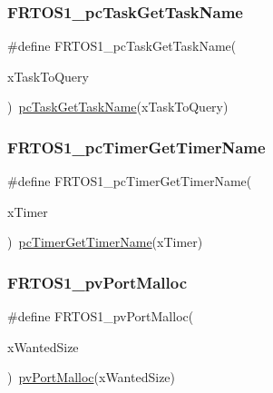 \subsubsection{\texorpdfstring{F\+R\+T\+O\+S1\+\_\+pc\+Task\+Get\+Task\+Name}{FRTOS1\_pcTaskGetTaskName}}
{\footnotesize\ttfamily \#define F\+R\+T\+O\+S1\+\_\+pc\+Task\+Get\+Task\+Name(\begin{DoxyParamCaption}\item[{}]{x\+Task\+To\+Query }\end{DoxyParamCaption})~\hyperlink{_free_r_t_o_s_8h_a626c65afa49005d067495a6cdaace885}{pc\+Task\+Get\+Task\+Name}(x\+Task\+To\+Query)}

\mbox{\label{group___f_r_t_o_s1__module_ga24e3ac503fa0d8a6b279b2f268b903bf}} 
\subsubsection{\texorpdfstring{F\+R\+T\+O\+S1\+\_\+pc\+Timer\+Get\+Timer\+Name}{FRTOS1\_pcTimerGetTimerName}}
{\footnotesize\ttfamily \#define F\+R\+T\+O\+S1\+\_\+pc\+Timer\+Get\+Timer\+Name(\begin{DoxyParamCaption}\item[{}]{x\+Timer }\end{DoxyParamCaption})~\hyperlink{_free_r_t_o_s_8h_a870358d5faa01a5290705b073de220ca}{pc\+Timer\+Get\+Timer\+Name}(x\+Timer)}

\mbox{\label{group___f_r_t_o_s1__module_ga142a1a9cfad95cf49afe6405ee62c89d}} 
\subsubsection{\texorpdfstring{F\+R\+T\+O\+S1\+\_\+pv\+Port\+Malloc}{FRTOS1\_pvPortMalloc}}
{\footnotesize\ttfamily \#define F\+R\+T\+O\+S1\+\_\+pv\+Port\+Malloc(\begin{DoxyParamCaption}\item[{}]{x\+Wanted\+Size }\end{DoxyParamCaption})~\hyperlink{portable_8h_a237d63f90b28e0950bd86f76815cd6e3}{pv\+Port\+Malloc}(x\+Wanted\+Size)}

